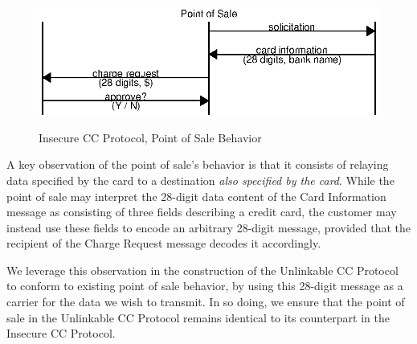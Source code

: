 \begin{figure}[h!]
  \caption{Insecure CC Protocol, Point of Sale Behavior}
  \centering
    \includegraphics{img/interface_pos.eps}
  \label{fig:interface_pos}
\end{figure}

A key observation of the point of sale's behavior is that it consists of relaying data
	specified by the card to a destination \emph{also specified by the card}.
While the point of sale may interpret the 28-digit data content of the Card Information message as consisting of three fields describing a credit card,
	the customer may instead use these fields to encode an arbitrary 28-digit message, provided that the recipient of the Charge Request message decodes it accordingly.

We leverage this observation in the construction of the Unlinkable CC Protocol to conform to existing point of sale behavior,
	by using this 28-digit message as a carrier for the data we wish to transmit.
In so doing, we ensure that the point of sale in the Unlinkable CC Protocol remains identical to its counterpart in the Insecure CC Protocol.
